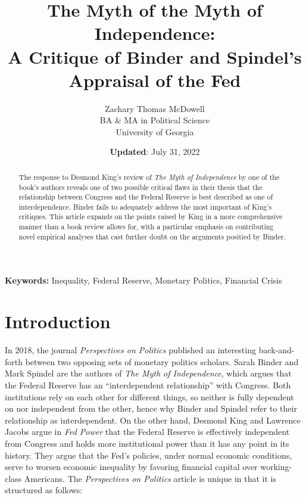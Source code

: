\documentclass[
  12pt,
]{article}
\title{The Myth of the Myth of Independence:\\
A Critique of Binder and Spindel's Appraisal of the Fed}
\author{Zachary Thomas McDowell\\
BA \& MA in Political Science\\
University of Georgia}
\date{\textbf{Updated}: July 31, 2022}
\providecommand{\keywords}[1]{\textbf{Keywords:} #1}
\begin{document}
\maketitle
\begin{abstract}
\singlespace The response to Desmond King's review of \emph{The Myth of
Independence} by one of the book's authors reveals one of two possible
critical flaws in their thesis that the relationship between Congress
and the Federal Reserve is best described as one of interdependence.
Binder fails to adequately address the most important of King's
critiques. This article expands on the points raised by King in a more
comprehensive manner than a book review allows for, with a particular
emphasis on contributing novel empirical analyses that cast further
doubt on the arguments positied by Binder.
\end{abstract}

\keywords{Inequality, Federal Reserve, Monetary Politics, Financial Crisis}

\let\thefootnote\relax\footnotetext{\lipsum[1][1-7]}

\thispagestyle{empty}

\newpage
{}

\thispagestyle{TOC}
\tableofcontents
\listoffigures
\listoftables
\clearpage
\newpage


\thispagestyle{INTRODUCTION}
\clearpage


\hypertarget{introduction}{%
\section*{Introduction}\label{introduction}}

In 2018, the journal \emph{Perspectives on Politics} published an
interesting back-and-forth between two opposing sets of monetary
politics scholars. Sarah Binder and Mark Spindel are the authors of
\emph{The Myth of Independence}, which argues that the Federal Reserve
has an ``interdependent relationship'' with Congress. Both institutions
rely on each other for different things, so neither is fully dependent
on nor independent from the other, hence why Binder and Spindel refer to
their relationship as interdependent. On the other hand, Desmond King
and Lawrence Jacobs argue in \emph{Fed Power} that the Federal Reserve
is effectively independent from Congress and holds more institutional
power than it has any point in its history. They argue that the Fed's
policies, under normal economic conditions, serve to worsen economic
inequality by favoring financial capital over working-class Americans.
The \emph{Perspectives on Politics} article is unique in that it is
structured as follows:
\end{document}
